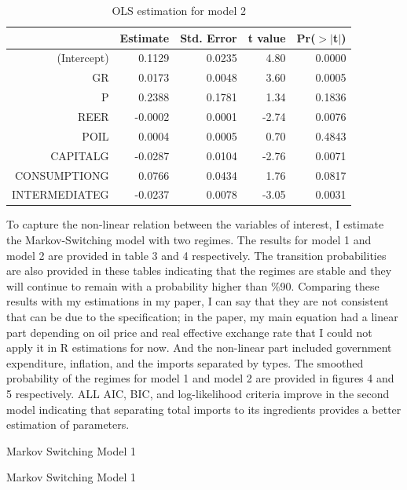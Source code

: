 \documentclass{article}
\begin{document}
\begin{table}[ht]
	\centering
	\caption{OLS estimation for model 2}
	\begin{tabular}{rrrrr}
		\hline
		& Estimate & Std. Error & t value & Pr($>$$|$t$|$) \\ 
		\hline
		(Intercept) & 0.1129 & 0.0235 & 4.80 & 0.0000 \\ 
		GR & 0.0173 & 0.0048 & 3.60 & 0.0005 \\ 
		P & 0.2388 & 0.1781 & 1.34 & 0.1836 \\ 
		REER & -0.0002 & 0.0001 & -2.74 & 0.0076 \\ 
		POIL & 0.0004 & 0.0005 & 0.70 & 0.4843 \\ 
		CAPITALG & -0.0287 & 0.0104 & -2.76 & 0.0071 \\ 
		CONSUMPTIONG & 0.0766 & 0.0434 & 1.76 & 0.0817 \\ 
		INTERMEDIATEG & -0.0237 & 0.0078 & -3.05 & 0.0031 \\ 
		\hline
	\end{tabular}
\end{table}


To capture the non-linear relation between the variables of interest, I estimate the Markov-Switching model with two regimes. The results for model 1 and model 2 are provided in table 3 and 4 respectively. The transition probabilities are also provided in these tables indicating that the regimes are stable and they will continue to remain with a probability higher than \%90. Comparing these results with my estimations in my paper, I can say that they are not consistent that can be due to the specification; in the paper, my main equation had a linear part depending on oil price and real effective exchange rate that I could not apply it in R estimations for now. And the non-linear part included government expenditure, inflation, and the imports separated by types. The smoothed probability of the regimes for model 1 and model 2 are provided in figures 4 and 5 respectively. ALL AIC, BIC, and log-likelihood criteria improve in the second model indicating that separating total imports to its ingredients provides a better estimation of parameters. 

\begin{table}
	\centering
	\caption{Markov Switching Model 1}
	\hline
	
	\hline
\end{table}

\begin{table}
	\centering
	\caption{Markov Switching Model 1}
	\hline
	
	\hline
\end{table}
\end{document}
